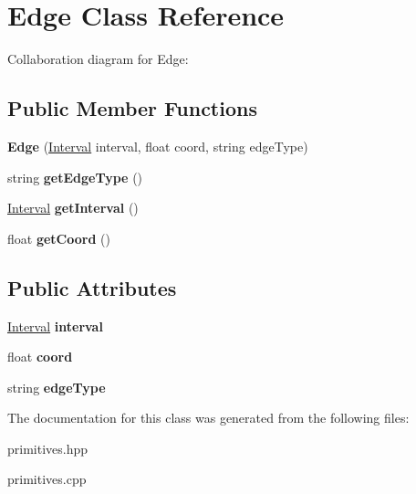 \hypertarget{classEdge}{}\section{Edge Class Reference}
\label{classEdge}


Collaboration diagram for Edge\+:
\subsection*{Public Member Functions}
\begin{DoxyCompactItemize}
\item 
\mbox{\label{classEdge_aad89ff4f7c85decf8b00c9f96b72ada3}} 
{\bfseries Edge} (\hyperlink{classInterval}{Interval} interval, float coord, string edge\+Type)
\item 
\mbox{\label{classEdge_ab996b76d5343965ad1087896e4c30446}} 
string {\bfseries get\+Edge\+Type} ()
\item 
\mbox{\label{classEdge_aafea0a338f79c8397f175d7a58017361}} 
\hyperlink{classInterval}{Interval} {\bfseries get\+Interval} ()
\item 
\mbox{\label{classEdge_a2bdfd6b59be8ab33b9ab1cd0d02f4ab7}} 
float {\bfseries get\+Coord} ()
\end{DoxyCompactItemize}
\subsection*{Public Attributes}
\begin{DoxyCompactItemize}
\item 
\mbox{\label{classEdge_aea4b96c270f7cf0ab157747898cd9d6b}} 
\hyperlink{classInterval}{Interval} {\bfseries interval}
\item 
\mbox{\label{classEdge_aa0650b73d48caaeffbc9cf7a0ac2725b}} 
float {\bfseries coord}
\item 
\mbox{\label{classEdge_a84c46c658b36890a71d6bfe82f02fea6}} 
string {\bfseries edge\+Type}
\end{DoxyCompactItemize}


The documentation for this class was generated from the following files\+:\begin{DoxyCompactItemize}
\item 
primitives.\+hpp\item 
primitives.\+cpp\end{DoxyCompactItemize}
